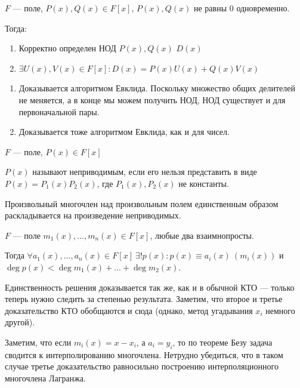 \begin{thrm}{}{}
    \( F \) --- поле, \( P(x), Q(x) \in F[x] \), \( P(x), Q(x) \) не равны \( 0 \)
    одновременно. 

    Тогда:
    \begin{enumerate}
        \item
            Корректно определен НОД \( P(x), Q(x) \) \( D(x) \)
        \item
            \(
                \exists U(x), V(x) \in F[x] : D(x) = P(x) U(x) + Q(x) V(x)
            \)
    \end{enumerate}
\end{thrm}

\begin{enumerate}
    \item
        Доказывается алгоритмом Евклида.
        Поскольку множество общих делителей не меняется,
        а в конце мы можем получить НОД,
        НОД существует и для первоначальной пары.
    \item
        Доказывается тоже алгоритмом Евклида, как и для чисел.
\end{enumerate}

\begin{defn}{}{}
    \( F \) --- поле, \( P(x) \in F[x] \)

    \( P(x) \) называют неприводимым, если его нельзя представить в виде
    \( P(x) = P_1 (x) P_2 (x) \), где \( P_1(x), P_2(x) \) не константы.
\end{defn}

\begin{thrm}{}{}
    Произвольный многочлен над произвольным полем единственным образом раскладывается на произведение неприводимых.
\end{thrm}

\begin{defn}{}{}
    \( F \) --- поле \( m_1(x), \ldots, m_n(x) \in F[x] \), любые два взаимнопросты.

    Тогда \( \forall a_1(x) ,\ldots, a_n(x) \in F[x] \: \exists! p(x) : p(x) \equiv a_i (x) \: (m_i(x)) \)
    и \( \deg p(x) < \deg m_1(x) + \ldots + \deg m_2(x) \).
\end{defn}

Единственность решения доказывается так же,
как и в обычной КТО --- только теперь нужно следить за степенью результата.
Заметим, что второе и третье доказательство КТО обобщаются и сюда
(однако, метод угадывания \( x_i \) немного другой).

\begin{remark}{}{}
    Заметим, что если \( m_i(x) = x - x_i \), а \( a_i = y_i \),
    то по теореме Безу задача сводится к интерполированию многочлена.
    Нетрудно убедиться, что в таком случае третье доказательство равносильно построению
    интерполяционного многочлена Лагранжа.
\end{remark}

